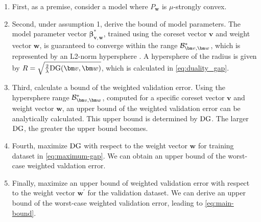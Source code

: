 \begin{enumerate}
  \item
  First, as a premise, consider a model where $P_{\boldsymbol{w}}$ is $\mu$-strongly convex.
  \item
  Second, under assumption 1, derive the bound of model parameters. The model parameter vector ${\bm \beta}^*_{\bm v, \bm w}$, trained using the coreset vector $\bm v$ and weight vector $\bm w$, is guaranteed to converge within the range ${\cal B}^*_{\bm v, \bm w}$, which is represented by an L2-norm hypersphere \citep{10.1162/neco_a_01619}. 
  A hypersphere of the radius is given by $R = \sqrt{\frac{2}{\lambda}{\rm DG}(\bm v, \bm w)}$, which is calculated in \eqref{eq:duality_gap}.
  \item
  Third, calculate a bound of the weighted validation error.
  Using the hypersphere range ${\cal B}^*_{\bm v, \bm w}$, computed for a specific coreset vector $\bm v$ and weight vector $\bm w$, an upper bound of the weighted validation error can be analytically calculated.
  This upper bound is determined by ${\rm DG}$. The larger ${\rm DG}$, the greater the upper bound becomes.
  \item
  Fourth, maximize ${\rm DG}$ with respect to the weight vector $\bm w$ for training dataset in \eqref{eq:maximum-gap}. We can obtain an upper bound of the worst-case weighted valdation error.
  \item
  Finally, maximize an upper bound of weighted validation error with respect to the weight vector $\bm w^\prime$ for the validation dataset.
  We can derive an upper bound of the worst-case weighted validation error, leading to \eqref{eq:main-bound}.
\end{enumerate}



